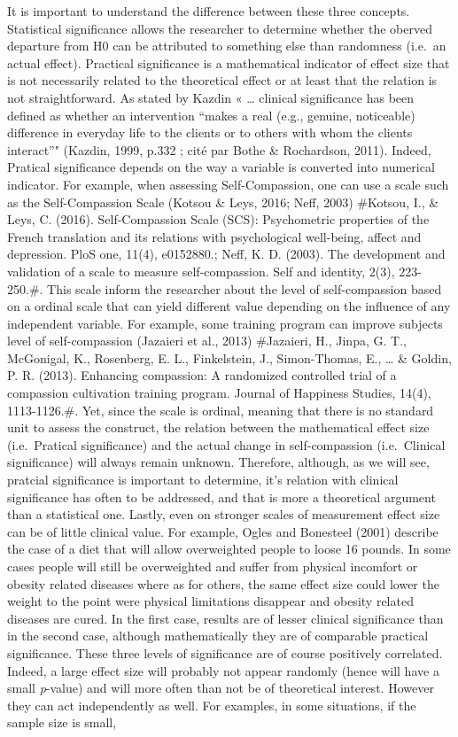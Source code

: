 \documentclass[man]{apa6}
\begin{document}
It is important to understand the difference between these three concepts. Statistical significance allows the researcher to determine whether the oberved departure from H0 can be attributed to something else than randomness (i.e.~an actual effect). Practical significance is a mathematical indicator of effect size that is not necessarily related to the theoretical effect or at least that the relation is not straightforward. As stated by Kazdin « \ldots{} clinical significance has been defined as whether an intervention \enquote{makes a real (e.g., genuine, noticeable) difference in everyday life to the clients or to others with whom the clients interact}" (Kazdin, 1999, p.332 ; cité par Bothe \& Rochardson, 2011). Indeed, Pratical significance depends on the way a variable is converted into numerical indicator. For example, when assessing Self-Compassion, one can use a scale such as the Self-Compassion Scale (Kotsou \& Leys, 2016; Neff, 2003) \#Kotsou, I., \& Leys, C. (2016). Self-Compassion Scale (SCS): Psychometric properties of the French translation and its relations with psychological well-being, affect and depression. PloS one, 11(4), e0152880.; Neff, K. D. (2003). The development and validation of a scale to measure self-compassion. Self and identity, 2(3), 223-250.\#. This scale inform the researcher about the level of self-compassion based on a ordinal scale that can yield different value depending on the influence of any independent variable. For example, some training program can improve subjects level of self-compassion (Jazaieri et al., 2013) \#Jazaieri, H., Jinpa, G. T., McGonigal, K., Rosenberg, E. L., Finkelstein, J., Simon-Thomas, E., \ldots{} \& Goldin, P. R. (2013). Enhancing compassion: A randomized controlled trial of a compassion cultivation training program. Journal of Happiness Studies, 14(4), 1113-1126.\#. Yet, since the scale is ordinal, meaning that there is no standard unit to assess the construct, the relation between the mathematical effect size (i.e.~Pratical significance) and the actual change in self-compassion (i.e.~Clinical significance) will always remain unknown. Therefore, although, as we will see, pratcial significance is important to determine, it's relation with clinical significance has often to be addressed, and that is more a theoretical argument than a statistical one. Lastly, even on stronger scales of measurement effect size can be of little clinical value. For example, Ogles and Bonesteel (2001) describe the case of a diet that will allow overweighted people to loose 16 pounds. In some cases people will still be overweighted and suffer from physical incomfort or obesity related diseases where as for others, the same effect size could lower the weight to the point were physical limitations disappear and obesity related diseases are cured. In the first case, results are of lesser clinical significance than in the second case, although mathematically they are of comparable practical significance. These three levels of significance are of course positively correlated. Indeed, a large effect size will probably not appear randomly (hence will have a small \emph{p}-value) and will more often than not be of theoretical interest. However they can act independently as well. For examples, in some situations, if the sample size is small, 
\end{document}
